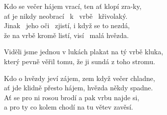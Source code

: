 
\ve{}
Kdo se večer hájem vrací, ten ať klopí zra-ky, \\
ať je nikdy neobrací \ k \ vrbě \ křivolaký. \\
Jinak \ jeho oči \ zjistí, i když se to nezdá, \\
že na vrbě kromě listí, visí \ malá hvězda.

\cho{}
Viděli jsme jednou v lukách plakat na tý vrbě kluka,\\
který pevně věřil tomu, že ji sundá z toho stromu. 

\ve{}
Kdo o hvězdy jeví zájem, zem když večer chladne,\\
ať jde klidně přesto hájem, hvězda někdy spadne.\\
Ať se pro ni rosou brodí a pak vrbu najde si,\\
a pro ty co kolem chodí na tu větev zavěsí.

\cho{}

\esong{}